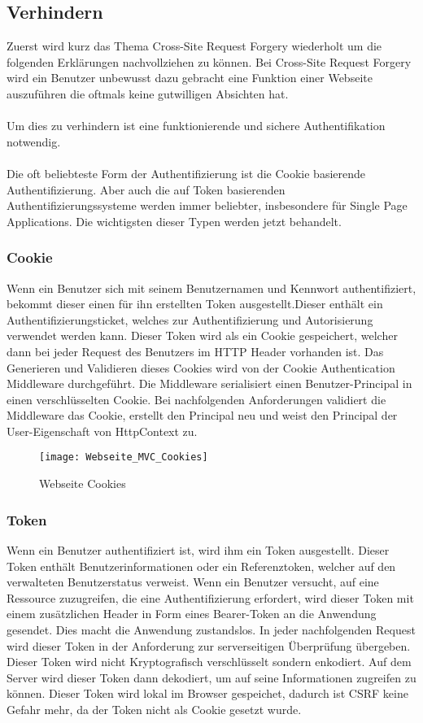 {\subsection{Verhindern}
\label{sec:xsrf_prevent}
Zuerst wird kurz das Thema Cross-Site Request Forgery wiederholt um die folgenden Erklärungen nachvollziehen zu können. Bei Cross-Site Request Forgery wird ein Benutzer unbewusst dazu gebracht eine Funktion einer Webseite auszuführen die oftmals keine gutwilligen Absichten hat.\\ \\Um dies zu verhindern ist eine funktionierende und sichere Authentifikation notwendig. \\ \\Die oft beliebteste Form der Authentifizierung ist die Cookie basierende Authentifizierung. Aber auch die auf Token basierenden Authentifizierungssysteme werden immer beliebter, insbesondere für Single Page Applications. Die wichtigsten dieser Typen werden jetzt behandelt.
\subsubsection{Cookie}
Wenn ein Benutzer sich mit seinem Benutzernamen und Kennwort authentifiziert, bekommt dieser einen für ihn erstellten Token ausgestellt.Dieser enthält ein Authentifizierungsticket, welches zur Authentifizierung und Autorisierung verwendet werden kann. Dieser Token wird als ein Cookie gespeichert, welcher dann bei jeder Request des Benutzers im HTTP Header vorhanden ist. Das Generieren und Validieren dieses Cookies wird von der Cookie Authentication Middleware durchgeführt. Die Middleware serialisiert einen Benutzer-Principal in einen verschlüsselten Cookie. Bei nachfolgenden Anforderungen validiert die Middleware das Cookie, erstellt den Principal neu und weist den Principal der User-Eigenschaft von HttpContext zu.
\begin{figure}[H]
    \texttt{[image: Webseite\_MVC\_Cookies]}
    \caption{Webseite Cookies}
    \label{fig:webcookies}
\end{figure}
\subsubsection{Token}
Wenn ein Benutzer authentifiziert ist, wird ihm ein Token ausgestellt. Dieser Token enthält Benutzerinformationen oder ein Referenztoken, welcher auf den verwalteten Benutzerstatus verweist. Wenn ein Benutzer versucht, auf eine Ressource zuzugreifen, die eine Authentifizierung erfordert, wird dieser Token mit einem zusätzlichen Header in Form eines Bearer-Token an die Anwendung gesendet. Dies macht die Anwendung zustandslos. In jeder nachfolgenden Request wird dieser Token in der Anforderung zur serverseitigen Überprüfung übergeben. Dieser Token wird nicht Kryptografisch verschlüsselt sondern enkodiert. Auf dem Server wird dieser Token dann dekodiert, um auf seine Informationen zugreifen zu können. Dieser Token wird lokal im Browser gespeichet, dadurch ist CSRF keine Gefahr mehr, da der Token nicht als Cookie gesetzt wurde.
}

